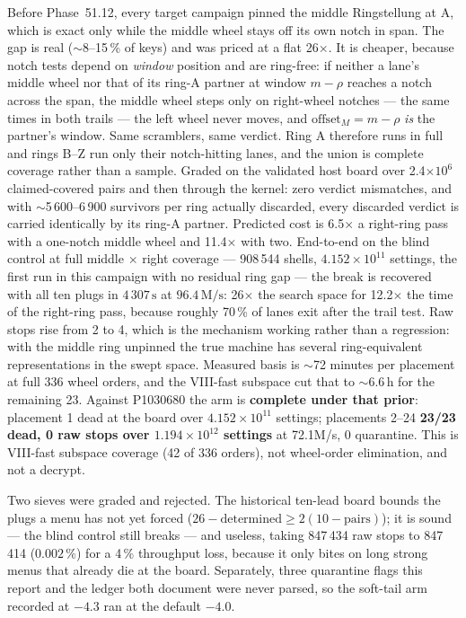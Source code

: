 \documentclass[11pt,a4paper]{article}
\begin{document}
Before Phase~51.12, every target campaign pinned the middle Ringstellung at A,
which is exact only
while the middle wheel stays off its own notch in span.
The gap is real ($\sim$8--15\,\% of keys) and was priced at a flat 26$\times$.
It is cheaper, because notch tests depend on \emph{window} position and are
ring-free: if neither a lane's middle wheel nor that of its ring-A partner at
window $m-\rho$ reaches a notch across the span, the middle wheel steps only on
right-wheel notches --- the same times in both trails --- the left wheel never
moves, and $\mathrm{offset}_M = m-\rho$ \emph{is} the partner's window.
Same scramblers, same verdict.
Ring A therefore runs in full and rings B--Z run only their notch-hitting lanes,
and the union is complete coverage rather than a sample.
Graded on the validated host board over 2.4$\times 10^{6}$ claimed-covered pairs
and then through the kernel: zero verdict mismatches, and with
$\sim$5\,600--6\,900 survivors per ring actually discarded, every discarded
verdict is carried identically by its ring-A partner.
Predicted cost is 6.5$\times$ a right-ring pass with a one-notch middle wheel and
11.4$\times$ with two.
End-to-end on the blind control at full middle $\times$ right coverage --- 908\,544
shells, $4.152\times10^{11}$ settings, the first run in this campaign with no
residual ring gap --- the break is recovered with all ten plugs in
$4\,307\,\mathrm{s}$ at $96.4\,\mathrm{M/s}$: 26$\times$ the search space for
12.2$\times$ the time of the right-ring pass, because roughly 70\,\% of lanes
exit after the trail test.
Raw stops rise from 2 to 4, which is the mechanism working rather than a
regression: with the middle ring unpinned the true machine has several
ring-equivalent representations in the swept space.
Measured basis is $\sim$72 minutes per placement at full 336 wheel orders, and
the VIII-fast subspace cut that to $\sim$6.6\,h for the remaining 23.
Against P1030680 the arm is \textbf{complete under that prior}: placement 1
dead at the board over $4.152\times10^{11}$ settings; placements 2--24
\textbf{23/23 dead, 0 raw stops over $1.194\times10^{12}$ settings} at
72.1M/s, 0 quarantine.
This is VIII-fast subspace coverage (42 of 336 orders), not wheel-order
elimination, and not a decrypt.

Two sieves were graded and rejected.
The historical ten-lead board bounds the plugs a menu has not yet forced
($26 - \mathrm{determined} \ge 2(10-\mathrm{pairs})$); it is sound --- the blind
control still breaks --- and useless, taking 847\,434 raw stops to 847\,414
($0.002\,\%$) for a 4\,\% throughput loss, because it only bites on long strong
menus that already die at the board.
Separately, three quarantine flags this report and the ledger both document were
never parsed, so the soft-tail arm recorded at $-4.3$ ran at the default $-4.0$.
\end{document}
